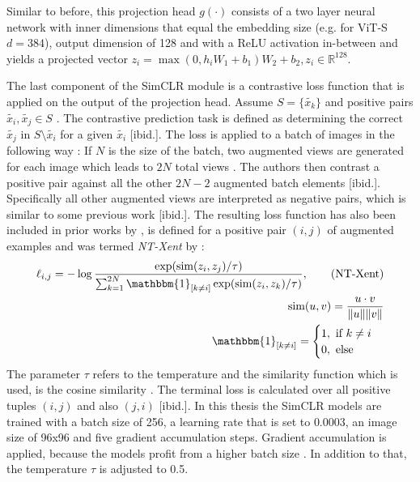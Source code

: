 Similar to before, this projection head $g(\cdot)$ consists of a two layer neural network with inner dimensions that equal the embedding size (e.g. for ViT-S $d=384$), output dimension of 128 and with a ReLU activation in-between \citep{Chen2020} and yields a projected vector $z_i = \max(0, h_iW_1 + b_1)W_2+b_2, z_i \in \mathbb{R}^{128}$.
\par 
The last component of the SimCLR module is a contrastive loss function that is applied on the output of the projection head.
Assume $S=\{{\tilde{x_k}}\}$ and positive pairs $\tilde{x_i}, \tilde{x_j} \in S$ \citep{Chen2020}.
The contrastive prediction task is defined as determining the correct $\tilde{x_j}$ in $S\setminus \tilde{x_i}$ for a given $\tilde{x_i}$ [ibid.].
The loss is applied to a batch of images in the following way \citep{Chen2020}:
If $N$ is the size of the batch, two augmented views are generated for each image which leads to $2N$ total views \citep{Chen2020}.
The authors then contrast a positive pair against all the other $2N-2$ augmented batch elements [ibid.].
Specifically all other augmented views are interpreted as negative pairs, which is similar to some previous work [ibid.].
The resulting loss function has also been included in prior works by \citep{Sohn2016,Wu2018,Oord2018}, is defined for a positive pair $(i,j)$ of augmented examples and was termed \textit{NT-Xent} by \citep{Chen2017}:
\begin{align}
	\ell_{i,j} = -\log\frac{\exp(\text{sim}(z_i,z_j)/\tau)}{\sum_{k=1}^{2N} \mathbbm{1}_{[k \neq i]}\exp(\text{sim}(z_i,z_k)/\tau)}, \tag{NT-Xent}\\
	\text{sim}(u,v) = \frac{u\cdot v}{\Vert u \Vert \Vert v \Vert} \\
	\mathbbm{1}_{[k \neq i]} = \begin{cases}
		1, \text{ if } k \neq i \\
		0, \text{ else}
	\end{cases}
\end{align}
The parameter $\tau$ refers to the temperature and the similarity function which is used, is the cosine similarity \citep{Chen2020}.
The terminal loss is calculated over all positive tuples $(i,j)$ and also $(j,i)$ [ibid.].
In this thesis the SimCLR models are trained with a batch size of 256, a learning rate that is set to $0.0003$, an image size of 96x96 and five gradient accumulation steps.
Gradient accumulation is applied, because the models profit from a higher batch size \citep{Chen2020}.
In addition to that, the temperature $\tau$ is adjusted to 0.5.
